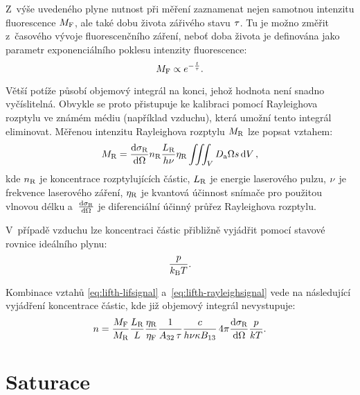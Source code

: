Z~výše uvedeného plyne nutnost při měření zaznamenat nejen samotnou
intenzitu fluorescence $M_\text{F}$,
ale také dobu života zářivého stavu $\tau$.
Tu je možno změřit z~časového vývoje fluorescenčního záření,
neboť doba života je definována jako parametr exponenciálního poklesu
intenzity fluorescence:
\begin{equation}
	M_\text{F} \propto e^{-\frac{t}{\tau}}.
\end{equation}

Větší potíže působí objemový integrál na konci, jehož hodnota není snadno
vyčíslitelná.
Obvykle se proto přistupuje ke kalibraci pomocí Ray\-leigh\-ova rozptylu
ve známém médiu (například vzduchu),
která umožní tento integrál eliminovat.
Měřenou intenzitu Rayleighova rozptylu $M_\text{R}$ lze popsat vztahem:
\begin{equation}
	\label{eq:lifth-rayleighsignal}
	M_\text{R} = \dv{\sigma_\text{R}}{\Omega} n_\text{R}
	\frac{L_\text{R}}{h\nu} \eta_\text{R}
	\iiint_V D_\text{a} \Omega s \dd{V},
\end{equation}
kde $n_\text{R}$ je koncentrace rozptylujících částic,
$L_\text{R}$ je energie laserového pulzu,
$\nu$ je frekvence laserového záření,
$\eta_\text{R}$ je kvantová účinnost snímače pro použitou vlnovou délku
a~$\dv{\sigma_\text{R}}{\Omega}$ je diferenciální účinný průřez Rayleighova rozptylu.

V~případě vzduchu lze koncentraci částic přibližně vyjádřit pomocí
stavové rovnice ideálního plynu:
\begin{equation}
	\frac{p}{k_\text{B}T}.
\end{equation}


Kombinace vztahů \eqref{eq:lifth-lifsignal} a~\eqref{eq:lifth-rayleighsignal}
vede na následující vyjádření koncentrace částic,
kde již objemový integrál nevystupuje:
\begin{equation}
	\label{eq:label}
	n = \frac{M_\text{F}}{M_\text{R}}
	\frac{L_\text{R}}{L}\frac{\eta_\text{R}}{\eta_\text{F}}
	\frac{1}{A_{32}\,\tau}
	\frac{c}{h\nu\kappa B_{13}}
	\, 4\pi \dv{\sigma_\text{R}}{\Omega} \frac{p}{kT}.
\end{equation}

\section{Saturace}
\label{sec:lifth-saturation}
